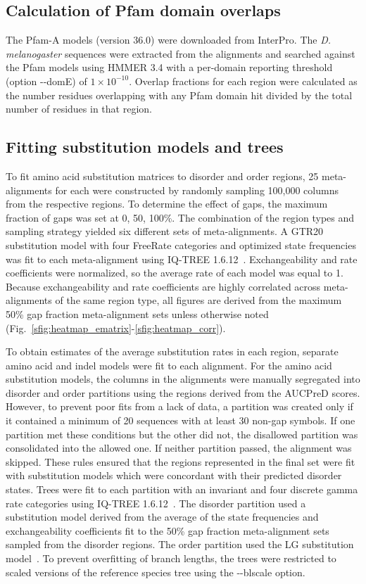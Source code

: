 \subsection{Calculation of Pfam domain overlaps}
The Pfam-A models (version 36.0) were downloaded from InterPro. The \textit{D. melanogaster} sequences were extracted from the alignments and searched against the Pfam models using HMMER 3.4 with a per-domain reporting threshold (option -{}-domE) of $1 \times 10^{-10}$. Overlap fractions for each region were calculated as the number residues overlapping with any Pfam domain hit divided by the total number of residues in that region.

\subsection{Fitting substitution models and trees}
To fit amino acid substitution matrices to disorder and order regions, 25 meta-alignments for each were constructed by randomly sampling 100,000 columns from the respective regions. To determine the effect of gaps, the maximum fraction of gaps was set at 0, 50, 100\%. The combination of the region types and sampling strategy yielded six different sets of meta-alignments. A GTR20 substitution model with four FreeRate categories and optimized state frequencies was fit to each meta-alignment using IQ-TREE 1.6.12~\cite{Nguyen2014}. Exchangeability and rate coefficients were normalized, so the average rate of each model was equal to 1. Because exchangeability and rate coefficients are highly correlated across meta-alignments of the same region type, all figures are derived from the maximum 50\% gap fraction meta-alignment sets unless otherwise noted (Fig.~\ref{sfig:heatmap_ematrix}-\ref{sfig:heatmap_corr}).

To obtain estimates of the average substitution rates in each region, separate amino acid and indel models were fit to each alignment. For the amino acid substitution models, the columns in the alignments were manually segregated into disorder and order partitions using the regions derived from the AUCPreD scores. However, to prevent poor fits from a lack of data, a partition was created only if it contained a minimum of 20 sequences with at least 30 non-gap symbols. If one partition met these conditions but the other did not, the disallowed partition was consolidated into the allowed one. If neither partition passed, the alignment was skipped. These rules ensured that the regions represented in the final set were fit with substitution models which were concordant with their predicted disorder states. Trees were fit to each partition with an invariant and four discrete gamma rate categories using IQ-TREE 1.6.12~\cite{Yang1994}. The disorder partition used a substitution model derived from the average of the state frequencies and exchangeability coefficients fit to the 50\% gap fraction meta-alignment sets sampled from the disorder regions. The order partition used the LG substitution model~\cite{Le2008}. To prevent overfitting of branch lengths, the trees were restricted to scaled versions of the reference species tree using the -{}-blscale option.

